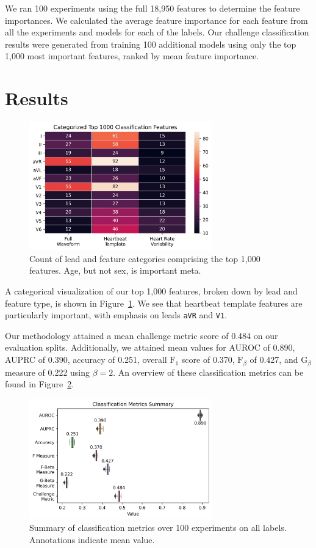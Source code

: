 \documentclass[twocolumn]{cinc}
\begin{document}
We ran 100 experiments using the full 18,950 features to determine the feature importances.
We calculated the average feature importance for each feature from all the experiments and models for each of the labels.
Our challenge classification results were generated from training 100 additional models using only the top 1,000 most important features, ranked by mean feature importance.

\section{Results}

\begin{figure}[ht]
  \centering
  \includegraphics[width=7.9cm]{fig/top_features.png}
  \caption{Count of lead and feature categories comprising the top 1,000 features. Age, but not sex, is important meta.}
  \label{fig:top_features}
\end{figure}

A categorical visualization of our top 1,000 features, broken down by lead and feature type, is shown in Figure~\ref{fig:top_features}.
We see that heartbeat template features are particularly important, with emphasis on leads \texttt{aVR} and \texttt{V1}.

Our methodology attained a mean challenge metric score of 0.484 on our evaluation splits.
Additionally, we attained mean values for AUROC of 0.890, AUPRC of 0.390, accuracy of 0.251, overall $\text{F}_1$ score of 0.370, $\text{F}_\beta$ of 0.427, and $\text{G}_\beta$ measure of 0.222 using $\beta = 2$.
An overview of these classification metrics can be found in Figure~\ref{fig:classification_metrics_summary}.

\begin{figure}[hb]
  \centering
  \includegraphics[width=7.9cm]{fig/classification_metrics.png}
  \caption{Summary of classification metrics over 100 experiments on all labels. Annotations indicate mean value.}
  \label{fig:classification_metrics_summary}
\end{figure}
\end{document}
